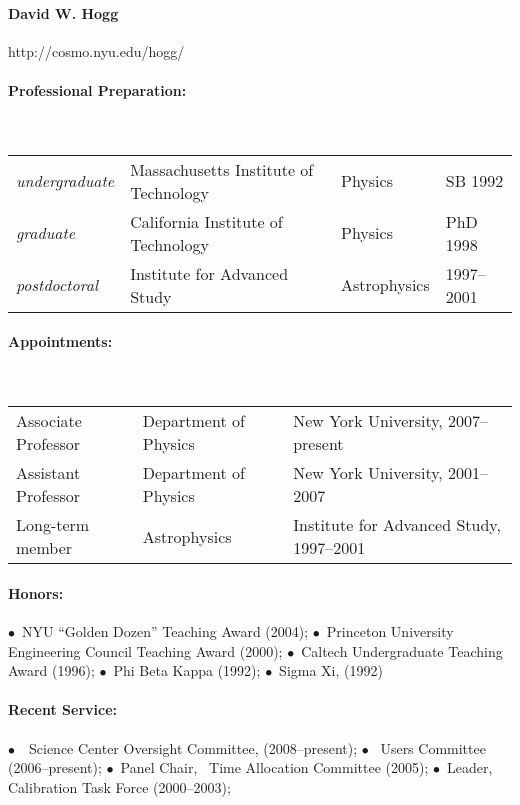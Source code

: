\documentclass[letterpaper,12pt]{article}
\begin{document}
\paragraph{David W. Hogg} http://cosmo.nyu.edu/hogg/

\paragraph{Professional Preparation:}~\\
\begin{tabular}{llll}
\textsl{undergraduate}
  & Massachusetts Institute of Technology & Physics & SB 1992\\
\textsl{graduate}
  & California Institute of Technology    & Physics & PhD 1998\\
\textsl{postdoctoral}
  & Institute for Advanced Study          & Astrophysics & 1997--2001
\end{tabular}
           
\paragraph{Appointments:}~\\
\begin{tabular}{lll}
Associate Professor & Department of Physics & New York University, 2007--present\\
Assistant Professor & Department of Physics & New York University, 2001--2007\\
Long-term member & Astrophysics & Institute for Advanced Study, 1997--2001 \\
\end{tabular}

\paragraph{Honors:}
$\bullet$~NYU ``Golden Dozen'' Teaching Award (2004);
$\bullet$~Princeton University Engineering Council Teaching Award (2000);
$\bullet$~Caltech Undergraduate Teaching Award (1996);
$\bullet$~Phi Beta Kappa (1992);
$\bullet$~Sigma Xi, (1992)

\paragraph{Recent Service:}
$\bullet$~\Spitzer\ Science Center Oversight Committee, (2008--present); 
$\bullet$~ Users Committee (2006--present);
$\bullet$~Panel Chair, \Spitzer\ Time Allocation Committee (2005);
$\bullet$~Leader,  Calibration Task Force (2000--2003);
\end{document}
